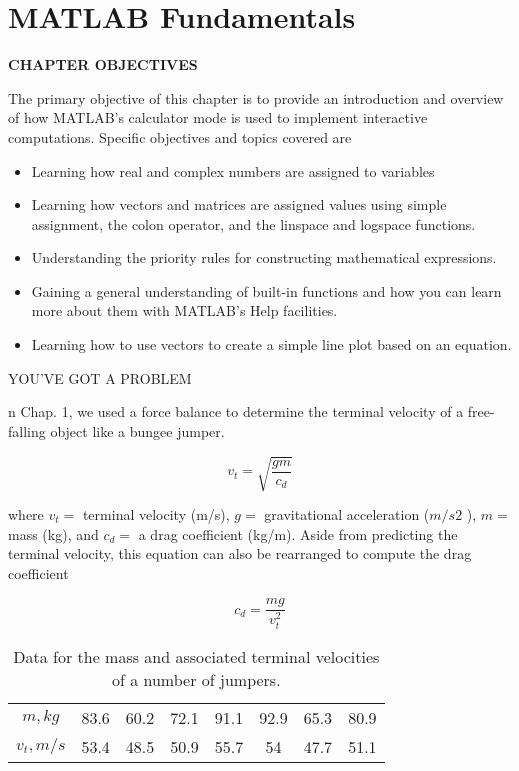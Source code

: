 \documentclass[../main.tex]{subfiles}
\begin{document}
\chapter{MATLAB Fundamentals}

\label{cha:cha3}


\begin{center}
\Large{\textbf{CHAPTER OBJECTIVES}}
\end{center}

\normalsize{The primary objective of this chapter is to provide an introduction and overview of
how MATLAB’s calculator mode is used to implement interactive computations.
Specific objectives and topics covered are}

\begin{itemize}



	\item Learning how real and complex numbers are assigned to variables
	\item  Learning how vectors and matrices are assigned values using simple assignment,
the colon operator, and the linspace and logspace functions.
\item  Understanding the priority rules for constructing mathematical expressions.
\item  Gaining a general understanding of built-in functions and how you can learn more
about them with MATLAB’s Help facilities.
\item  Learning how to use vectors to create a simple line plot based on an equation.
\end{itemize}
\Large{YOU'VE GOT A PROBLEM}
\normalsize

n Chap. 1, we used a force balance to determine the terminal velocity of a free-falling
object like a bungee jumper.

$$v_t=\sqrt{\dfrac{gm}{c_d}}  $$

where $v_t =$ terminal velocity (m/s), $g =$ gravitational acceleration ($m/s2$
), $m =$ mass (kg),
and $c_d =$ a drag coefficient (kg/m). Aside from predicting the terminal velocity, this equation can also be rearranged to compute the drag coefficient
 
\begin{equation}
	\tag{2.1}
	c_d = \dfrac{mg}{v^2_t}
\end{equation} 



	\begin{table}[H]
		\centering
		\caption{Data for the mass and associated terminal velocities of a number of jumpers.}
		\begin{tabular}{cccccccc}
			\hline
			$m, kg$ 	&83.6 &60.2 &72.1 &91.1 &92.9 &65.3 &80.9\\
			$v_t, m/s$ &53.4 &48.5 &50.9 &55.7 &54 &47.7 &51.1\\
			\hline
			
		\end{tabular}
	\end{table}
\end{document}
